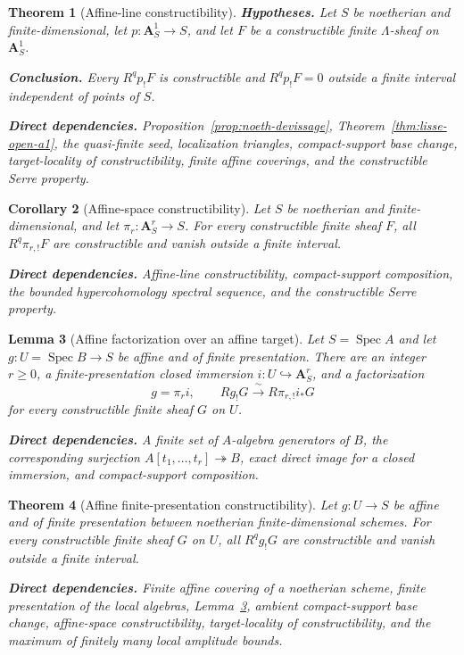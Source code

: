 \documentclass[10pt]{article}
\newtheorem{theorem}{Theorem}[section]
\newtheorem{lemma}[theorem]{Lemma}
\newtheorem{corollary}[theorem]{Corollary}
\theoremstyle{definition}
\newcommand{\Spec}{\operatorname{Spec}}
\newcommand{\deps}[1]{\par\smallskip\noindent\textbf{Direct dependencies.} #1}
\begin{document}
\begin{theorem}[Affine-line constructibility]
\label{thm:a1-constructible}
\textbf{Hypotheses.} Let $S$ be noetherian and finite-dimensional, let
$p:\mathbf A^1_S\to S$, and let $F$ be a constructible finite
$\Lambda$-sheaf on $\mathbf A^1_S$.

\textbf{Conclusion.} Every $R^qp_!F$ is constructible and
$R^qp_!F=0$ outside a finite interval independent of points of $S$.
\deps{Proposition~\ref{prop:noeth-devissage},
Theorem~\ref{thm:lisse-open-a1}, the quasi-finite seed, localization
triangles, compact-support base change, target-locality of constructibility,
finite affine coverings, and the constructible Serre property.}
\end{theorem}

\begin{corollary}[Affine-space constructibility]
\label{cor:affine-space}
Let $S$ be noetherian and finite-dimensional, and let
$\pi_r:\mathbf A^r_S\to S$.
For every constructible finite sheaf $F$,
all $R^q\pi_{r,!}F$ are constructible and vanish outside a finite interval.
\deps{Affine-line constructibility, compact-support composition, the
bounded hypercohomology spectral sequence, and the constructible Serre
property.}
\end{corollary}

\begin{lemma}[Affine factorization over an affine target]
\label{lem:affine-factorization}
Let $S=\Spec A$ and let $g:U=\Spec B\to S$ be affine and of finite
presentation.  There are an integer $r\geq0$, a finite-presentation closed
immersion $i:U\hookrightarrow\mathbf A^r_S$, and a factorization
\[
 g=\pi_ri,
 \qquad
 Rg_!G\xrightarrow{\ \sim\ }R\pi_{r,!}i_*G
\]
for every constructible finite sheaf $G$ on $U$.
\deps{A finite set of $A$-algebra generators of $B$, the corresponding
surjection $A[t_1,\ldots,t_r]\twoheadrightarrow B$, exact direct image for a
closed immersion, and compact-support composition.}
\end{lemma}

\begin{theorem}[Affine finite-presentation constructibility]
\label{thm:affine-morphism}
Let $g:U\to S$ be affine and of finite presentation between noetherian
finite-dimensional schemes.  For every constructible finite sheaf $G$ on
$U$, all $R^qg_!G$ are constructible and vanish outside a finite interval.
\deps{Finite affine covering of a noetherian scheme, finite presentation of
the local algebras, Lemma~\ref{lem:affine-factorization}, ambient
compact-support base change, affine-space constructibility, target-locality
of constructibility, and the maximum of finitely many local amplitude
bounds.}
\end{theorem}
\end{document}
